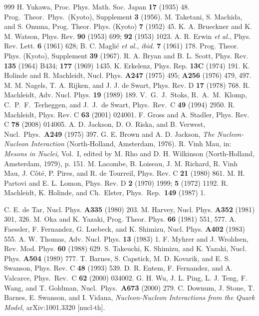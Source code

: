 \documentclass[sort&compress,preprint,3p]{elsarticle}
\begin{document}
\begin{thebibliography}{999}
 H. Yukawa, Proc. Phys. Math. Soc. Japan {\bf 17} (1935)
48.
 Prog.\ Theor.\ Phys.\ (Kyoto), Supplement {\bf 3} (1956).
M. Taketani, S. Machida, and S. Onuma,
Prog. Theor. Phys. (Kyoto) {\bf 7} (1952) 45.
 K. A. Brueckner and K. M. Watson, 
Phys. Rev.  {\bf 90} (1953) 699; {\bf 92} (1953) 1023.
 A. R. Erwin {\it et al.},
Phys. Rev. Lett. {\bf 6} (1961) 628;
B. C. Magli\'{c} {\it et al.},
{\it ibid.} {\bf 7} (1961) 178.
 Prog. Theor. Phys. (Kyoto), Supplement {\bf 39} (1967).
 R. A. Bryan and B. L. Scott, Phys. Rev. {\bf 135} (1964) B434; {\bf 177} (1969) 1435.
 K. Erkelenz, Phys. Rep. {\bf 13C} (1974) 191.
 K. Holinde and R. Machleidt, Nucl. Phys. {\bf A247} (1975) 495; {\bf A256} (1976) 479, 497.
 M. M. Nagels, T. A. Rijken, and J. J. de Swart,
Phys. Rev. D {\bf 17} (1978) 768.
 R. Machleidt, Adv. Nucl. Phys. {\bf 19} (1989) 189.
V.\ G.\ J.\ Stoks, R.\ A.\ M.\ Klomp, 
C.\ P.\ F.\ Terheggen, and J.\ J.\ de Swart, 
Phys.\ Rev.\ C {\bf 49} (1994) 2950.
 R. Machleidt, Phys. Rev. C {\bf 63} (2001) 024001.
F. Gross and A. Stadler, Phys. Rev. C {\bf 78} (2008) 014005.
 A. D. Jackson, D. O. Riska, and B. Verwest,
Nucl.\ Phys.\ {\bf A249} (1975) 397.
G. E. Brown and A. D. Jackson, {\it The Nucleon-Nucleon Interaction}
(North-Holland, Amsterdam, 1976).
 R. Vinh Mau, 
in: {\it Mesons in Nuclei}, Vol.~I,
edited by M. Rho and D. H. Wilkinson 
(North-Holland, Amsterdam, 1979), 
p. 151.
M. Lacombe, B. Loiseau, J. M. Richard, R. Vinh Mau,
J. C\^{o}t\'{e}, P. Pires, and R. de Tourreil, 
Phys. Rev. C {\bf 21} (1980) 861.
M. H. Partovi and E. L. Lomon, Phys. Rev. D {\bf 2} (1970) 1999; {\bf 5} (1972) 1192.
 R. Machleidt, K. Holinde, and Ch.\ Elster,
Phys.\ Rep.\ {\bf 149} (1987) 1.

C. E. de Tar, Nucl. Phys. {\bf A335} (1980) 203.
M. Harvey, Nucl. Phys. {\bf A352} (1981) 301, 326.
M. Oka and K. Yazaki, Prog. Theor. Phys. {\bf 66} (1981) 551, 577.
A. Faessler, F. Fernandez, G. Luebeck, and K. Shimizu,
Nucl. Phys. {\bf A402} (1983) 555.
A. W. Thomas, Adv. Nucl. Phys. {\bf 13} (1983) 1.
F. Myhrer and J. Wroldsen, Rev. Mod. Phys. {\bf 60} (1988) 629.
S. Takeuchi, K. Shimizu, and K. Yazaki, Nucl. Phys. {\bf A504} (1989) 777.
T. Barnes, S. Capstick, M. D. Kovarik, and E. S. Swanson,
Phys. Rev. C {\bf 48} (1993) 539. 
 D. R. Entem, F. Fernandez, and A. Valcarce, 
Phys.\ Rev.\ C {\bf 62} (2000) 034002.
 G. H. Wu, J. L. Ping, L. J. Teng, F. Wang, and
T. Goldman, Nucl.\ Phys.\ {\bf A673} (2000) 279.
C. Downum, J. Stone, T. Barnes, E. Swanson, and I. Vidana,
{\it Nucleon-Nucleon Interactions from the Quark Model},
arXiv:1001.3320 [nucl-th].


\end{thebibliography}
\end{document}
